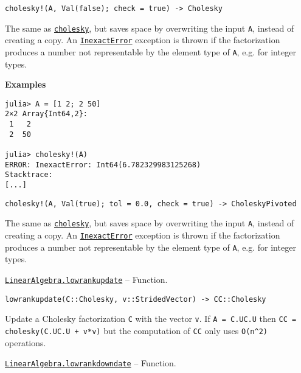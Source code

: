 \begin{adjustwidth}{2em}{0pt}


\begin{verbatim}
cholesky!(A, Val(false); check = true) -> Cholesky
\end{verbatim}

The same as \hyperlink{7653413936706994771}{\texttt{cholesky}}, but saves space by overwriting the input \texttt{A}, instead of creating a copy. An \hyperlink{5399118524830636312}{\texttt{InexactError}} exception is thrown if the factorization produces a number not representable by the element type of \texttt{A}, e.g. for integer types.

\textbf{Examples}


\begin{verbatim}
julia> A = [1 2; 2 50]
2×2 Array{Int64,2}:
 1   2
 2  50

julia> cholesky!(A)
ERROR: InexactError: Int64(6.782329983125268)
Stacktrace:
[...]
\end{verbatim}




\begin{lstlisting}
cholesky!(A, Val(true); tol = 0.0, check = true) -> CholeskyPivoted
\end{lstlisting}

The same as \hyperlink{7653413936706994771}{\texttt{cholesky}}, but saves space by overwriting the input \texttt{A}, instead of creating a copy. An \hyperlink{5399118524830636312}{\texttt{InexactError}} exception is thrown if the factorization produces a number not representable by the element type of \texttt{A}, e.g. for integer types.



\end{adjustwidth}
\hypertarget{11384711924205954768}{} 
\hyperlink{11384711924205954768}{\texttt{LinearAlgebra.lowrankupdate}}  -- {Function.}

\begin{adjustwidth}{2em}{0pt}


\begin{verbatim}
lowrankupdate(C::Cholesky, v::StridedVector) -> CC::Cholesky
\end{verbatim}

Update a Cholesky factorization \texttt{C} with the vector \texttt{v}. If \texttt{A = C.U{\textquotesingle}C.U} then \texttt{CC = cholesky(C.U{\textquotesingle}C.U + v*v{\textquotesingle})} but the computation of \texttt{CC} only uses \texttt{O(n{\textasciicircum}2)} operations.



\end{adjustwidth}
\hypertarget{17556419310056499978}{} 
\hyperlink{17556419310056499978}{\texttt{LinearAlgebra.lowrankdowndate}}  -- {Function.}

